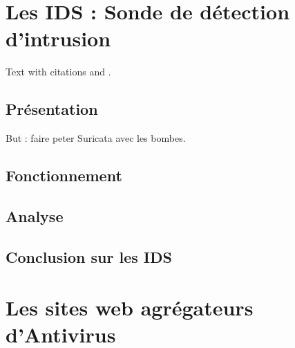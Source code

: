 \documentclass[smallextended]{svjour3}       %
\begin{document}
\newpage
\section{Les IDS : Sonde de détection d'intrusion}
\label{sec1:ids}
Text with citations \cite{Suricata} and \cite{virustotal}.

\subsection{Présentation}
\label{ids:présentation}
But : faire peter Suricata avec les bombes.

\subsection{Fonctionnement}
\label{ids:fonctionnement}

\subsection{Analyse}
\label{ids:analyse}

\subsection{Conclusion sur les IDS}
\label{ids:conclusion}

\newpage
\section{Les sites web agrégateurs d'Antivirus}
\label{sec2:agrégateurs}

\end{document}
